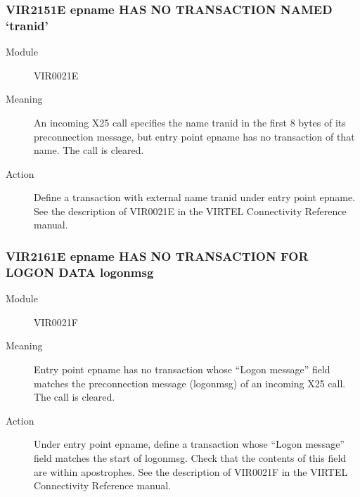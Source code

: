 \documentclass[letterpaper,10pt,english]{sphinxmanual}
\begin{document}
\subsubsection{VIR2151E epname HAS NO TRANSACTION NAMED ‘tranid’}
\label{\detokenize{messages:vir2151e-epname-has-no-transaction-named-tranid}}\begin{description}
\item[{Module}] \leavevmode
VIR0021E

\item[{Meaning}] \leavevmode
An incoming X25 call specifies the name tranid in the first 8 bytes of its preconnection message, but entry point epname has no transaction of that name. The call is cleared.

\item[{Action}] \leavevmode
Define a transaction with external name tranid under entry point epname. See the description of VIR0021E in the VIRTEL Connectivity Reference manual.

\end{description}


\subsubsection{VIR2161E epname HAS NO TRANSACTION FOR LOGON DATA logonmsg}
\label{\detokenize{messages:vir2161e-epname-has-no-transaction-for-logon-data-logonmsg}}\begin{description}
\item[{Module}] \leavevmode
VIR0021F

\item[{Meaning}] \leavevmode
Entry point epname has no transaction whose “Logon message” field matches the preconnection message (logonmsg) of an incoming X25 call. The call is cleared.

\item[{Action}] \leavevmode
Under entry point epname, define a transaction whose “Logon message” field matches the start of logonmsg. Check that the contents of this field are within apostrophes. See the description of VIR0021F in the VIRTEL Connectivity Reference manual.

\end{description}
\end{document}
